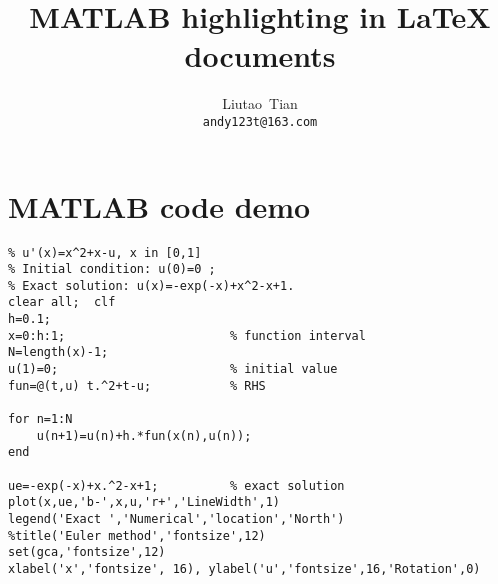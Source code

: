 \documentclass[11pt]{article}
\title{MATLAB highlighting in LaTeX documents}
\author{Liutao~Tian \\ \texttt{andy123t@163.com}}
\date{}
\begin{document}
\maketitle

\section{MATLAB code demo}

\begin{lstlisting}[title={Euler method}]
% Euler method for the ODE model
% u'(x)=x^2+x-u, x in [0,1]
% Initial condition: u(0)=0 ;
% Exact solution: u(x)=-exp(-x)+x^2-x+1.
clear all;  clf
h=0.1;
x=0:h:1;                       % function interval
N=length(x)-1;
u(1)=0;                        % initial value
fun=@(t,u) t.^2+t-u;           % RHS

for n=1:N
    u(n+1)=u(n)+h.*fun(x(n),u(n));
end

ue=-exp(-x)+x.^2-x+1;          % exact solution
plot(x,ue,'b-',x,u,'r+','LineWidth',1)
legend('Exact ','Numerical','location','North')
%title('Euler method','fontsize',12)
set(gca,'fontsize',12)
xlabel('x','fontsize', 16), ylabel('u','fontsize',16,'Rotation',0)
\end{lstlisting}
\end{document}
